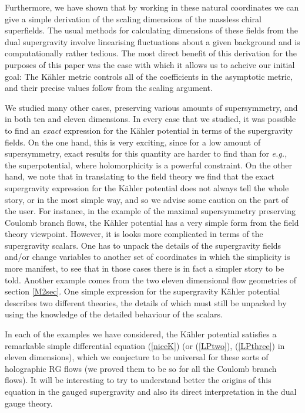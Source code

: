 \documentclass[a4paper,12pt]{article}
\newcommand{\reef}[1]{(\ref{#1})}
\begin{document}
Furthermore, we have shown that by working in these natural coordinates
we can give a simple derivation of the scaling dimensions of the
massless chiral superfields. The usual methods for calculating
dimensions of these fields from the dual supergravity involve
linearising fluctuations about a given background and is
computationally rather tedious. The most direct benefit of this
derivation for the purposes of this paper was the ease with which it
allows us to acheive our initial goal: The K\"ahler metric controls
all of the coefficients in the asymptotic metric, and their precise
values follow from the scaling argument.

We studied many other cases, preserving various amounts of
supersymmetry, and in both ten and eleven dimensions. In every case
that we studied, it was possible to find an {\it exact} expression for
the K\"ahler potential in terms of the supergravity fields. On the
one hand, this is very exciting, since for a low amount of
supersymmetry, exact results for this quantity are harder to find than
for {\it e.g.,} the superpotential, where holomorphicity is a powerful
constraint.  On the other hand, we note that in translating to the
field theory we find that the exact supergravity expression for the
K\"ahler potential does not always tell the whole story, or in the
most simple way, and so we advise some caution on the part of the
user.  For instance, in the example of the maximal supersymmetry
preserving Coulomb branch flows, the K\"ahler potential has a very
simple form from the field theory viewpoint.  However, it is looks
more complicated in terms of the supergravity scalars. One has to
unpack the details of the supergravity fields and/or change variables
to another set of coordinates in which the simplicity is more
manifest\cite{bakas,bakas2,beh,kraus}, to see that in those cases
there is in fact a simpler story to be told.  Another example comes
from the two eleven dimensional flow geometries of section
\ref{M2sec}.  One simple expression for the supergravity K\"ahler
potential describes two different theories, the details of which must
still be unpacked by using the knowledge of the detailed behaviour of
the scalars.

In each of the examples we have considered, the K\"ahler potential
satisfies a remarkable simple differential equation \reef{niceK} (or
\reef{LPtwo}, \reef{LPthree} in eleven dimensions), which we
conjecture to be universal for these sorts of holographic RG flows (we
proved them to be so for all the Coulomb branch flows).  It will be
interesting to try to understand better the origins of this equation
in the gauged supergravity and also its direct interpretation in the
dual gauge theory.
\end{document}
